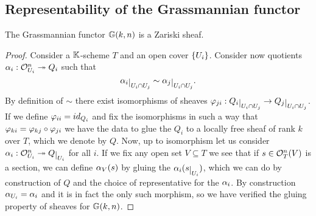 \subsection{Representability of the Grassmannian functor}
\begin{proposition}
The Grassmannian functor $\mathbb{G}(k,n)$ is a Zariski sheaf.
\end{proposition}
\begin{proof}
Consider a $\mathbb{K}$-scheme $T$ and an open cover $\left\{{U_i}\right\}$. Consider now quotients $\alpha_i:\mathcal{O}_{U_i}^n\twoheadrightarrow Q_i$ such that 
\[\al_i\res{U_i\cap U_j}\sim \al_j\res{U_i\cap U_j}.\]	
By definition of $\sim$ there exist isomorphisms of sheaves $\vp_{ji}:Q_i\res{U_{i}\cap U_j}\to Q_j\res{U_i\cap U_j}$. If we define $\varphi_{ii}=id_{Q_i}$ and fix the isomorphisms in such a way that $\varphi_{ki}=\varphi_{kj}\circ \varphi_{ji}$ we have the data to glue the $Q_i$ to a locally free sheaf of rank $k$ over $T$, which we denote by $Q$. Now, up to isomorphism let us consider $\al_i:\Oc_{U_i}^n\onto Q\res{U_i}$ for all $i$. If we fix any open set $V\subseteq T$ we see that if $s\in \mathcal{O}_T^n(V)$ is a section, we can define $\alpha_V(s)$ by gluing the $\al_i(s\res{U_i})$, which we can do by construction of $Q$ and the choice of representative for the $\alpha_i$. By construction $\alpha_{U_i}=\alpha_i$ and it is in fact the only such morphism, so we have verified the gluing property of sheaves for $\mathbb{G}(k,n)$.
\end{proof}

